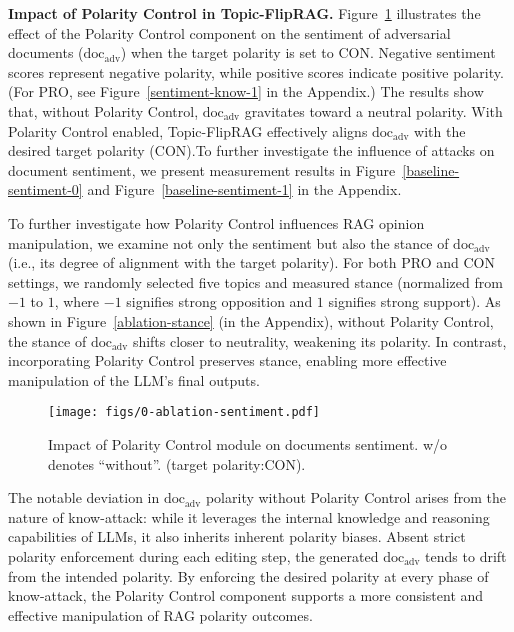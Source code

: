 \textbf{Impact of Polarity Control in Topic-FlipRAG.}
Figure~\ref{sentiment-know} illustrates the effect of the Polarity Control component on the sentiment of adversarial documents (\(\text{doc}_{\text{adv}}\)) when the target polarity is set to CON. Negative sentiment scores represent negative polarity, while positive scores indicate positive polarity. (For PRO, see Figure~\ref{sentiment-know-1} in the Appendix.) The results show that, without Polarity Control, \(\text{doc}_{\text{adv}}\) gravitates toward a neutral polarity. With Polarity Control enabled, Topic-FlipRAG effectively aligns \(\text{doc}_{\text{adv}}\) with the desired target polarity (CON).To further investigate the influence of attacks on document sentiment, we present measurement results in Figure~\ref{baseline-sentiment-0} and Figure~\ref{baseline-sentiment-1} in the Appendix.


To further investigate how Polarity Control influences RAG opinion manipulation, we examine not only the sentiment but also the stance of \(\text{doc}_{\text{adv}}\) (i.e., its degree of alignment with the target polarity). For both PRO and CON settings, we randomly selected five topics and measured stance (normalized from \(-1\) to \(1\), where \(-1\) signifies strong opposition and \(1\) signifies strong support). As shown in Figure~\ref{ablation-stance} (in the Appendix), without Polarity Control, the stance of \(\text{doc}_{\text{adv}}\) shifts closer to neutrality, weakening its polarity. In contrast, incorporating Polarity Control preserves stance, enabling more effective manipulation of the LLM’s final outputs.

\begin{figure}[!t]
  \centering
  \texttt{[image: figs/0-ablation-sentiment.pdf]}
  \caption{Impact of Polarity Control module on documents sentiment. w/o denotes ``without''. (target polarity:CON). }
  \label{sentiment-know}
\end{figure}


The notable deviation in \(\text{doc}_{\text{adv}}\) polarity without Polarity Control arises from the nature of know-attack: while it leverages the internal knowledge and reasoning capabilities of LLMs, it also inherits inherent polarity biases. Absent strict polarity enforcement during each editing step, the generated \(\text{doc}_{\text{adv}}\) tends to drift from the intended polarity. By enforcing the desired polarity at every phase of know-attack, the Polarity Control component supports a more consistent and effective manipulation of RAG polarity outcomes.


